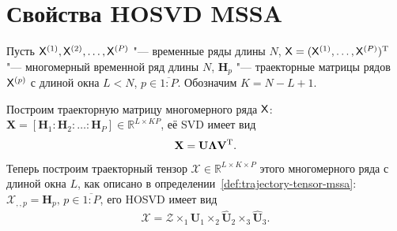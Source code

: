 \documentclass[specialist,
    substylefile = spbu_report.rtx,
    subf,href,colorlinks=true, 12pt]{disser}
\theoremstyle{plain}
\theoremstyle{definition}
\theoremstyle{remark}
\begin{document}


    \section{Свойства HOSVD MSSA}\label{sec:hosvd-mssa-properties}
    Пусть $\mathsf{X}^{(1)}, \mathsf{X}^{(2)}, \ldots, \mathsf{X}^{(P)}$ "--- временные ряды длины $N$,
    $\mathsf{X} = (\mathsf{X}^{(1)},\ldots, \mathsf{X}^{(P)})^{\mathrm{T}}$ "--- многомерный временной ряд длины $N$,
    $\mathbf{H}_p$ "--- траекторные матрицы рядов $\mathsf{X}^{(p)}$ с длиной окна $L < N$, $p\in \overline{1:P}$.
    Обозначим $K = N - L + 1$.

    Построим траекторную матрицу многомерного ряда $\mathsf{X}$:
    $\mathbf{X} = [\mathbf{H}_1: \mathbf{H}_2: \ldots: \mathbf{H}_P] \in \mathbb{R}^{L\times KP}$,
    её SVD имеет вид
    \begin{gather*}
        \mathbf{X} =\mathbf{U} \mathbf{\Lambda} \mathbf{V}^{\mathrm{T}}.
    \end{gather*}
    Теперь построим траекторный тензор $\mathcal{X}\in \mathbb{R}^{L\times K \times P}$ этого многомерного ряда
    с длиной окна $L$, как описано в определении~\ref{def:trajectory-tensor-mssa}:
    $\mathcal{X}_{,,p} = \mathbf{H}_p,\, p\in \overline{1:P}$,
    его HOSVD имеет вид
    \begin{gather}
        \mathcal{X}=\mathcal{Z} \times_1 \hat{\mathbf{U}}_1 \times_2 \hat{\mathbf{U}}_2 \times_3 \hat{\mathbf{U}}_3.
        \label{eq:subspace-tens-hosvd}
    \end{gather}
\end{document}
